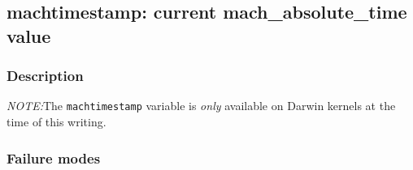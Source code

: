 \clearpage
{}
{}
\label{vars:machtimestamp}
\subsection*{machtimestamp: current mach\_absolute\_time value}

\subsubsection*{Description}

\emph{NOTE:}The \verb|machtimestamp| variable is \emph{only} available
on Darwin kernels at the time of this writing.

\subsubsection*{Failure modes}
